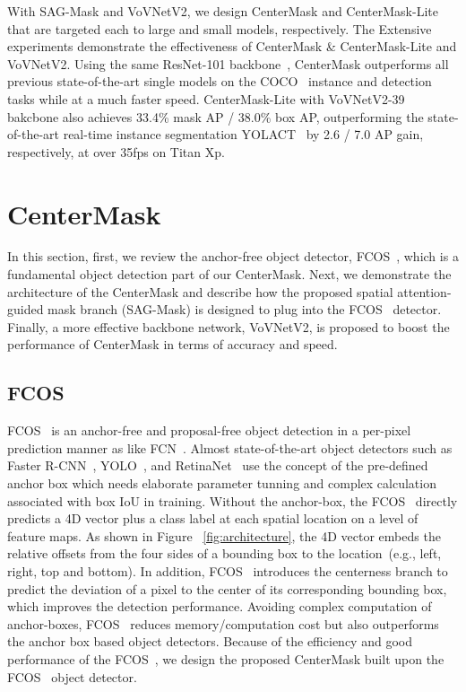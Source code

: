 \documentclass[10pt,twocolumn,letterpaper]{article}
\begin{document}
With SAG-Mask and VoVNetV2, we design CenterMask and CenterMask-Lite that are targeted each to large and small models, respectively.
The Extensive experiments demonstrate the effectiveness of CenterMask \& CenterMask-Lite and VoVNetV2.
Using the same ResNet-101 backbone~\cite{he2016deep}, CenterMask outperforms all previous state-of-the-art single models on the COCO~\cite{lin2014microsoft} instance and detection tasks while at a much faster speed.
CenterMask-Lite with VoVNetV2-39 bakcbone also achieves 33.4\% mask AP / 38.0\% box AP, outperforming the state-of-the-art real-time instance segmentation YOLACT~\cite{Bolya_2019_ICCV} by 2.6 / 7.0 AP gain, respectively, at over 35fps on Titan Xp.







\section{CenterMask}
In this section, first, we review the anchor-free object detector, FCOS~\cite{Tian_2019_ICCV}, which is a fundamental object detection part of our CenterMask. 
Next, we demonstrate the architecture of the CenterMask and describe how the proposed spatial attention-guided mask branch (SAG-Mask) is designed to plug into the FCOS~\cite{Tian_2019_ICCV} detector. 
Finally, a more effective backbone network, VoVNetV2, is proposed to boost the performance of CenterMask in terms of accuracy and speed.

\subsection{FCOS}
FCOS~\cite{Tian_2019_ICCV} is an anchor-free and proposal-free object detection in a per-pixel prediction manner as like FCN~\cite{long2015fully}.
Almost state-of-the-art object detectors such as Faster R-CNN~\cite{ren2015faster}, YOLO~\cite{redmon2016you}, and RetinaNet~\cite{lin2018focal} use the concept of the pre-defined anchor box which needs elaborate parameter tunning and complex calculation associated with box IoU in training.
Without the anchor-box, the FCOS~\cite{Tian_2019_ICCV} directly predicts a 4D vector plus a class label at each spatial location on a level of feature maps.
As shown in Figure ~\ref{fig:architecture}, the 4D vector embeds the relative offsets from the four sides of a bounding box to the location~(e.g., left, right, top and bottom).
In addition, FCOS~\cite{Tian_2019_ICCV} introduces the centerness branch to predict the deviation of a pixel to the center of its corresponding bounding box, which improves the detection performance.
Avoiding complex computation of anchor-boxes, FCOS~\cite{Tian_2019_ICCV} reduces memory/computation cost but also outperforms the anchor box based object detectors.
Because of the efficiency and good performance of the FCOS~\cite{Tian_2019_ICCV}, we design the proposed CenterMask built upon the FCOS~\cite{Tian_2019_ICCV} object detector.
\end{document}
